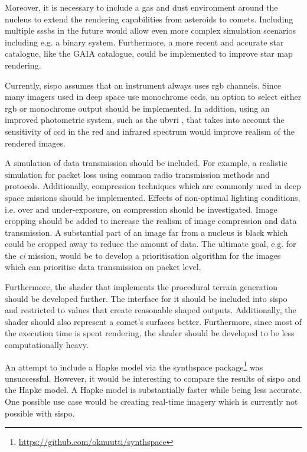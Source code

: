 Moreover, it is necessary to include a gas and dust environment around the nucleus to extend the rendering capabilities from asteroids to comets. Including multiple \glspl{sssb} in the future would allow even more complex simulation scenarios including e.g. a binary system. Furthermore, a more recent and accurate star catalogue, like the GAIA catalogue, could be implemented to improve star map rendering.

Currently, \gls{sispo} assumes that an instrument always uses \gls{rgb} channels. Since many imagers used in deep space use monochrome \glspl{ccd}, an option to select either \gls{rgb} or monochrome output should be implemented. In addition, using an improved photometric system, such as the \gls{ubvri} \cite{Bessell1993PhotometricSystems}, that takes into account the sensitivity of \gls{ccd} in the red and infrared spectrum would improve realism of the rendered images.

A simulation of data transmission should be included. For example, a realistic simulation for packet loss using common radio transmission methods and protocols. Additionally, compression techniques which are commonly used in deep space missions should be implemented. Effects of non-optimal lighting conditions, i.e. over and under-exposure, on compression should be investigated. Image cropping should be added to increase the realism of image compression and data transmission. A substantial part of an image far from a nucleus is black which could be cropped away to reduce the amount of data. The ultimate goal, e.g. for the \textit{\gls{ci}} mission, would be to develop a prioritisation algorithm for the images which can prioritise data transmission on packet level.

Furthermore, the shader that implements the procedural terrain generation should be developed further. The interface for it should be included into \gls{sispo} and restricted to values that create reasonable shaped outputs. Additionally, the shader should also represent a comet's surfaces better. Furthermore, since most of the execution time is spent rendering, the shader should be developed to be less computationally heavy.

An attempt to include a Hapke model via the synthspace package\footnote{\url{https://github.com/oknuutti/synthspace}} was unsuccessful. However, it would be interesting to compare the results of \gls{sispo} and the Hapke model. A Hapke model is substantially faster while being less accurate. One possible use case would be creating real-time imagery which is currently not possible with \gls{sispo}.